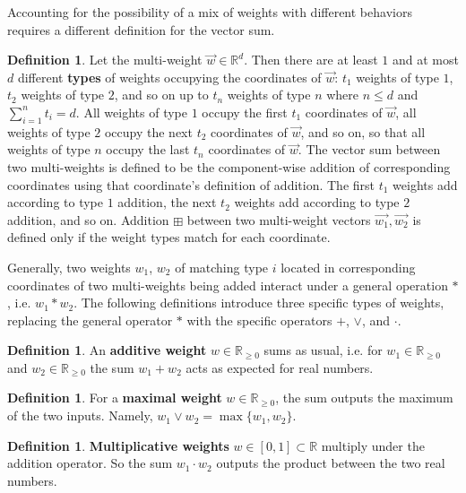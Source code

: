 \documentclass[12pt]{amsart}
\theoremstyle{definition}
\newtheorem{definition}[thm]{Definition}
\theoremstyle{remark}
\numberwithin{equation}{section}
\newcommand{\R}{\mathbb{R}}
\begin{document}
Accounting for the possibility of a mix of weights with different behaviors requires a different definition for the vector sum.

\begin{definition}
Let the multi-weight $\vec{w} \in \R^d$. Then there are at least $1$ and at most $d$ different \textbf{types} of weights occupying the coordinates of $\vec{w}$: $t_1$ weights of type $1$, $t_2$ weights of type $2$, and so on up to $t_n$ weights of type $n$ where $n \le d$ and $\sum_{i=1}^n t_i = d$. All weights of type $1$ occupy the first $t_1$ coordinates of $\vec{w}$, all weights of type $2$ occupy the next $t_2$ coordinates of $\vec{w}$, and so on, so that all weights of type $n$ occupy the last $t_n$ coordinates of $\vec{w}$. The vector sum between two multi-weights is defined to be the component-wise addition of corresponding coordinates using that coordinate's definition of addition. The first $t_1$ weights add according to type $1$ addition, the next $t_2$ weights add according to type $2$ addition, and so on. Addition $\boxplus$ between two multi-weight vectors $\vec{w_1}, \vec{w_2}$ is defined only if the weight types match for each coordinate.
\end{definition}

Generally, two weights $w_1$, $w_2$ of matching type $i$ located in corresponding coordinates of two multi-weights being added  interact under a general operation $\ast$, i.e. $w_1 \ast w_2$.  The following definitions introduce three specific types of weights, replacing the general operator $\ast$ with the specific operators $+$, $\vee$, and $\cdot$.

\begin{definition}
An \textbf{additive weight} $w \in \R_{\ge 0}$ sums as usual, i.e. for $w_1 \in \R_{\ge 0}$ and $w_2 \in \R_{\ge 0}$ the sum $w_1 + w_2$ acts as expected for real numbers.
\end{definition}

\begin{definition}
For a \textbf{maximal weight} $w \in \R_{\ge 0}$, the sum outputs the maximum of the two inputs. Namely, $w_1 \vee w_2 = \max\{w_1,w_2\}$.
\end{definition}

\begin{definition}
\textbf{Multiplicative weights} $w \in [0,1] \subset \R$ multiply under the addition operator. So the sum $w_1 \cdot w_2$ outputs the product between the two real numbers.
\end{definition}
\end{document}
